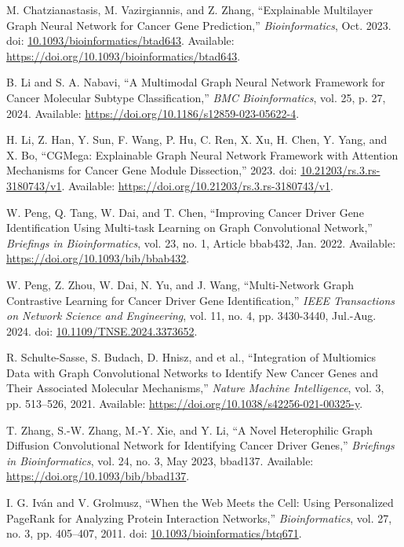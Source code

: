 \documentclass[conference]{IEEEtran}
\begin{document}
\begin{thebibliography}{99}

M. Chatzianastasis, M. Vazirgiannis, and Z. Zhang, ``Explainable Multilayer Graph Neural Network for Cancer Gene Prediction,'' \textit{Bioinformatics}, Oct. 2023. doi: \url{10.1093/bioinformatics/btad643}. Available: \url{https://doi.org/10.1093/bioinformatics/btad643}.

B. Li and S. A. Nabavi, ``A Multimodal Graph Neural Network Framework for Cancer Molecular Subtype Classification,'' \textit{BMC Bioinformatics}, vol. 25, p. 27, 2024. Available: \url{https://doi.org/10.1186/s12859-023-05622-4}.

H. Li, Z. Han, Y. Sun, F. Wang, P. Hu, C. Ren, X. Xu, H. Chen, Y. Yang, and X. Bo, ``CGMega: Explainable Graph Neural Network Framework with Attention Mechanisms for Cancer Gene Module Dissection,'' 2023. doi: \url{10.21203/rs.3.rs-3180743/v1}. Available: \url{https://doi.org/10.21203/rs.3.rs-3180743/v1}.


W. Peng, Q. Tang, W. Dai, and T. Chen, ``Improving Cancer Driver Gene Identification Using Multi-task Learning on Graph Convolutional Network,'' \textit{Briefings in Bioinformatics}, vol. 23, no. 1, Article bbab432, Jan. 2022. Available: \url{https://doi.org/10.1093/bib/bbab432}.

W. Peng, Z. Zhou, W. Dai, N. Yu, and J. Wang, ``Multi-Network Graph Contrastive Learning for Cancer Driver Gene Identification,'' \textit{IEEE Transactions on Network Science and Engineering}, vol. 11, no. 4, pp. 3430-3440, Jul.-Aug. 2024. doi: \url{10.1109/TNSE.2024.3373652}.


R. Schulte-Sasse, S. Budach, D. Hnisz, and et al., ``Integration of Multiomics Data with Graph Convolutional Networks to Identify New Cancer Genes and Their Associated Molecular Mechanisms,'' \textit{Nature Machine Intelligence}, vol. 3, pp. 513–526, 2021. Available: \url{https://doi.org/10.1038/s42256-021-00325-y}. 


T. Zhang, S.-W. Zhang, M.-Y. Xie, and Y. Li, ``A Novel Heterophilic Graph Diffusion Convolutional Network for Identifying Cancer Driver Genes,'' \textit{Briefings in Bioinformatics}, vol. 24, no. 3, May 2023, bbad137. Available: \url{https://doi.org/10.1093/bib/bbad137}.

I. G. Iván and V. Grolmusz, ``When the Web Meets the Cell: Using Personalized PageRank for Analyzing Protein Interaction Networks,'' \textit{Bioinformatics}, vol. 27, no. 3, pp. 405–407, 2011. doi: \url{10.1093/bioinformatics/btq671}.



\end{thebibliography}
\end{document}

